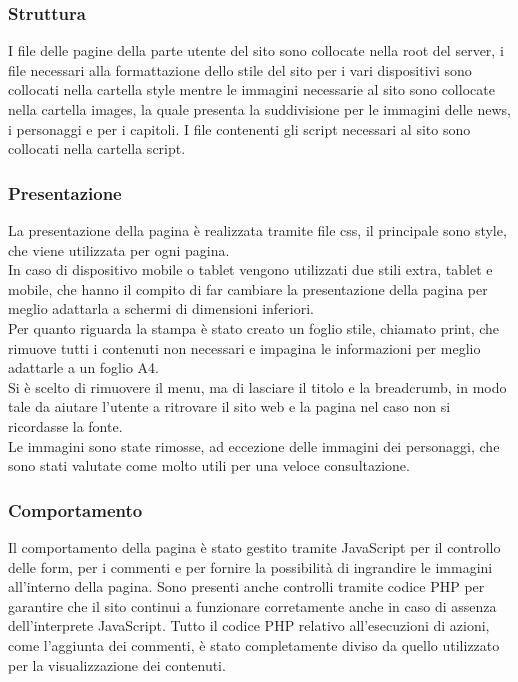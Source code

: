 \documentclass[openany, a4paper, 12pt]{report}
\begin{document}
			\subsubsection{Struttura}
			I file delle pagine della parte utente del sito sono collocate nella root del server, i file necessari alla formattazione dello stile del sito per i vari dispositivi sono collocati nella cartella style mentre le immagini necessarie al sito sono collocate nella cartella images, la quale presenta la suddivisione per le immagini delle news, i personaggi e per i capitoli. I file contenenti gli script necessari al sito sono collocati nella cartella script.
			\subsubsection{Presentazione}
			La presentazione della pagina è realizzata tramite file css, il principale sono style, che viene utilizzata per ogni pagina.\\
			In caso di dispositivo mobile o tablet vengono utilizzati due stili extra, tablet e mobile, che hanno il compito di far cambiare la presentazione della pagina per meglio adattarla a schermi di dimensioni inferiori.\\
			Per quanto riguarda la stampa è stato creato un foglio stile, chiamato print, che rimuove tutti i contenuti non necessari e impagina le informazioni per meglio adattarle a un foglio A4.\\
			Si è scelto di rimuovere il menu, ma di lasciare il titolo e la breadcrumb, in modo tale da aiutare l'utente a ritrovare il sito web e la pagina nel caso non si ricordasse la fonte.\\
			Le immagini sono state rimosse, ad eccezione delle immagini dei personaggi, che sono stati valutate come molto utili per una veloce consultazione.
			
			\subsubsection{Comportamento}
			Il comportamento della pagina è stato gestito tramite JavaScript per il controllo delle form, per i commenti e per fornire la possibilità di ingrandire le immagini all'interno della pagina. Sono presenti anche controlli tramite codice PHP per garantire che il sito continui a funzionare corretamente anche in caso di assenza dell'interprete JavaScript.
			Tutto il codice PHP relativo all'esecuzioni di azioni, come l'aggiunta dei commenti, è stato completamente diviso da quello utilizzato per la visualizzazione dei contenuti.\\
\end{document}
